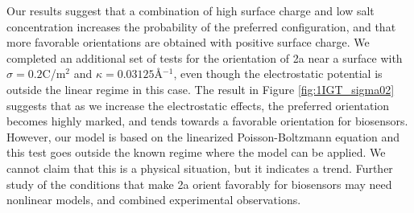 Our results suggest that a combination of high surface charge and low salt concentration increases the probability of the preferred configuration, and that more favorable orientations are obtained with positive surface charge.
We completed an additional set of tests for the orientation of \ig 2a near a surface with $\sigma =0.2$C/m${^2}$ and $\kappa=0.03125$\AA$^{-1}$, even though the electrostatic potential is outside the linear regime in this case.
The result in Figure \ref{fig:1IGT_sigma02} suggests that as we increase the electrostatic effects, the preferred orientation becomes highly marked, and tends towards a favorable orientation for biosensors.
However, our model is based on the linearized Poisson-Boltzmann equation and this test goes outside the known regime where the model can be applied. We cannot claim that this is a physical situation, but it indicates a trend. Further study of the conditions that make \ig 2a orient favorably for biosensors may need nonlinear models, and combined experimental observations.

\begin{figure*}
   \centering
   \caption{Orientation probability distribution and surface potential of the preferred orientation for immunoglobulin G near a surface with $\sigma=0.2$C/m$^2$ and $\kappa=0.03125$\AA$^{-1}$. Note that these conditions are outside the range of linearized theory (as explained in the Discussion). }
   \label{fig:1IGT_sigma02}
\end{figure*}